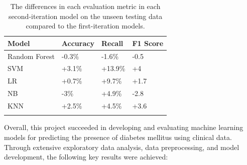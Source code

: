 \documentclass[12pt]{report}
\newcommand{\para}{\vspace{8pt}\noindent}
\begin{document}
\begin{longtable}{ | p{} | p{} | p{} | p{} | }
    \hline
    \cellcolor{blue!25} Model & \cellcolor{blue!25} Accuracy & \cellcolor{blue!25} Recall & \cellcolor{blue!25} F1 Score\\
    \hline
    Random Forest & \cellcolor{red!25} -0.3\% & \cellcolor{red!25}-1.6\% & \cellcolor{red!25} -0.5\\ 
    \hline
    SVM & \cellcolor{green!18}+3.1\% & \cellcolor{green!18}+13.9\% & \cellcolor{green!18}+4\\ 
    \hline
    LR & \cellcolor{green!18}+0.7\% & \cellcolor{green!18}+9.7\% & \cellcolor{green!18}+1.7\\
    \hline
    NB & \cellcolor{red!25}-3\% & \cellcolor{green!18}+4.9\% & \cellcolor{red!25}-2.8\\
    \hline
    KNN & \cellcolor{green!18}+2.5\% & \cellcolor{green!18}+4.5\% & \cellcolor{green!18}+3.6\\
    \hline
    \caption{The differences in each evaluation metric in each second-iteration model on the unseen testing data compared to the first-iteration models.}\label{tab:Improvements}
\end{longtable}

\pagebreak 
\para Overall, this project succeeded in developing and evaluating machine learning models for predicting the presence of diabetes mellitus using clinical data. 
Through extensive exploratory data analysis, data preprocessing, and model development, the following key results were achieved:
\end{document}
